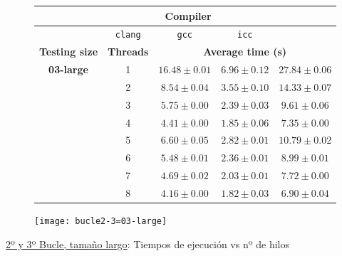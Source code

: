 \begin{figure}[H]
    \centering
    \begin{subfigure}{0.4\textwidth}
        \begin{adjustbox}{width=\textwidth} 
        \begin{tabular}{|c|c|c|c|c|}
            \hline
            \rowcolor{azul} \multicolumn{2}{|c|}{}&\multicolumn{3}{c|}{\textbf{Compiler}} \\ \hline
            \rowcolor{azul} \multicolumn{2}{|c|}{}&\texttt{clang}&\texttt{gcc}&\texttt{icc}\\ \hline
            \rowcolor{azul} \textbf{Testing size} & \textbf{Threads}&\multicolumn{3}{c|}{\textbf{Average time (s)}} \\ \hline
            \multirow{8}{1cm}{\textbf{03-large}} & 1 & \(16.48\pm{0.01}\) & \(6.96\pm{0.12}\) & \(27.84\pm{0.06}\) \\ \cline{2-5}
            & 2 & \(8.54\pm{0.04}\) & \(3.55\pm{0.10}\) & \(14.33\pm{0.07}\) \\ \cline{2-5}
            & 3 & \(5.75\pm{0.00}\) & \(2.39\pm{0.03}\) & \(9.61\pm{0.06}\) \\ \cline{2-5}
            & 4 & \(4.41\pm{0.00}\) & \(1.85\pm{0.06}\) & \(7.35\pm{0.00}\) \\ \cline{2-5}
            & 5 & \(6.60\pm{0.05}\) & \(2.82\pm{0.01}\) & \(10.79\pm{0.02}\) \\ \cline{2-5}
            & 6 & \(5.48\pm{0.01}\) & \(2.36\pm{0.01}\) & \(8.99\pm{0.01}\) \\ \cline{2-5}
            & 7 & \(4.69\pm{0.02}\) & \(2.03\pm{0.01}\) & \(7.72\pm{0.00}\) \\ \cline{2-5}
            & 8 & \(4.16\pm{0.00}\) & \(1.82\pm{0.03}\) & \(6.90\pm{0.04}\) \\ \hline
        \end{tabular}
        \end{adjustbox}
    \end{subfigure}
    \hfill
    \begin{subfigure}{0.5\textwidth}
        \texttt{[image: bucle2-3=03-large]}
    \end{subfigure}
    \caption{\underline{2º y 3º Bucle, tamaño largo}: Tiempos de ejecución vs nº de hilos}
    \label{bucle2-3=03-large}
\end{figure}

